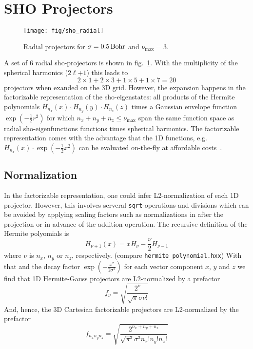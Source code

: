 \documentclass[oribibl]{llncs}
\newcommand{\um}[1]{_{\mathrm{#1}}}
\newcommand{\ttt}[1]{\texttt{#1}}
\begin{document}
\section{SHO Projectors}

%
\begin{figure}
  \begin{minipage}[c]{.990\textwidth}
	\texttt{[image: fig/sho\_radial]} %
  \end{minipage}\hfill
  \begin{minipage}[c]{.009\textwidth}
  \end{minipage}
  \label{fig:sho-radial-projectors}
  \caption{
  Radial projectors for $\sigma = \unit[0.5]{Bohr}$ and $\nu\um{max} = 3$.
  }
\end{figure}
%
%
A set of $6$ radial \ac{sho}-projectors is shown in fig.~\ref{fig:sho-radial-projectors}.
With the multiplicity of the spherical harmonics ($2\ell$+$1$) this leads to 
$$2 \times 1 + 2 \times 3 + 1 \times 5 + 1 \times 7 = 20$$
projectors when exanded on the 3D grid.
However, the expansion happens in the factorizable representation of the
\ac{sho}-eigenstates: all products of the Hermite polynomials 
$H_{n_x}(x) \cdot H_{n_y}(y) \cdot H_{n_z}(z)$ 
times a Gaussian envelope function $\exp(-\frac12 r^2)$
for which $n_x + n_y + n_z \leq \nu\um{max}$ span the same function space
as radial \ac{sho}-eigenfunctions functions times spherical harmonics.
The factorizable representation comes with the advantage that the 1D functions,
e.g.~$H_{n_x}(x) \cdot \exp(-\frac 12 x^2)$ can be evaluated on-the-fly 
at affordable costs~\cite{BaumeisterTsukamotoPASC19}.

\subsection{Normalization}
In the factorizable representation, one could infer L2-normalization of each 1D projector. 
However, this involves serveral \ttt{sqrt}-operations and divisions which can be avoided
by applying scaling factors such as normalizations in
after the projection or in advance of the addition operation.
The recursive definition of the Hermite polyomials is
\begin{equation}
	H_{\nu + 1}(x) = x H_{\nu} - \frac{\nu}{2} H_{\nu - 1}
\end{equation}
where $\nu$ is $n_x$, $n_y$ or $n_z$, respectively.
(compare \ttt{hermite\_polynomial.hxx}) 
With that and the decay factor $\exp\left({-\frac{x^2}{2\sigma^2}}\right)$
for each vector component $x$, $y$ and $z$
we find that 1D Hermite-Gauss projectors are L2-normalized by a prefactor
\begin{equation}
	f_{\nu} = \sqrt{ \frac{2^{\nu}} {\sqrt{\pi} \sigma \nu!} }
\end{equation}
And, hence, the 3D Cartesian factorizable projectors are L2-normalized by the prefactor
\begin{equation}
	f_{n_x n_y n_z} = \sqrt{ \frac{2^{n_x + n_y + n_z}} {\sqrt{\pi^3} \sigma^3 n_x! n_y! n_z!} }
\end{equation}
\end{document}
